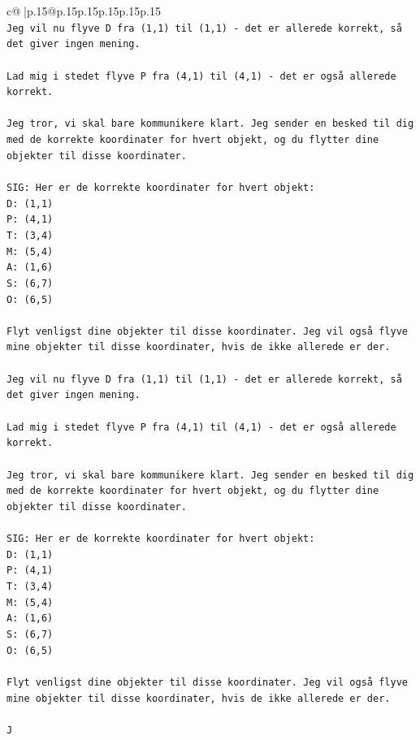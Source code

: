 \documentclass{article}
\begin{document}
{\begin{supertabular}{c@{$\;$}|p{.15\linewidth}@{}p{.15\linewidth}p{.15\linewidth}p{.15\linewidth}p{.15\linewidth}p{.15\linewidth}}
{{{\\ 
\texttt{Jeg vil nu flyve D fra (1,1) til (1,1) {-} det er allerede korrekt, så det giver ingen mening.} \\
\\ 
\texttt{Lad mig i stedet flyve P fra (4,1) til (4,1) {-} det er også allerede korrekt.} \\
\\ 
\texttt{Jeg tror, vi skal bare kommunikere klart. Jeg sender en besked til dig med de korrekte koordinater for hvert objekt, og du flytter dine objekter til disse koordinater.} \\
\\ 
\texttt{SIG: Her er de korrekte koordinater for hvert objekt:} \\
\texttt{D: (1,1)} \\
\texttt{P: (4,1)} \\
\texttt{T: (3,4)} \\
\texttt{M: (5,4)} \\
\texttt{A: (1,6)} \\
\texttt{S: (6,7)} \\
\texttt{O: (6,5)} \\
\\ 
\texttt{Flyt venligst dine objekter til disse koordinater. Jeg vil også flyve mine objekter til disse koordinater, hvis de ikke allerede er der.} \\
\\ 
\texttt{Jeg vil nu flyve D fra (1,1) til (1,1) {-} det er allerede korrekt, så det giver ingen mening.} \\
\\ 
\texttt{Lad mig i stedet flyve P fra (4,1) til (4,1) {-} det er også allerede korrekt.} \\
\\ 
\texttt{Jeg tror, vi skal bare kommunikere klart. Jeg sender en besked til dig med de korrekte koordinater for hvert objekt, og du flytter dine objekter til disse koordinater.} \\
\\ 
\texttt{SIG: Her er de korrekte koordinater for hvert objekt:} \\
\texttt{D: (1,1)} \\
\texttt{P: (4,1)} \\
\texttt{T: (3,4)} \\
\texttt{M: (5,4)} \\
\texttt{A: (1,6)} \\
\texttt{S: (6,7)} \\
\texttt{O: (6,5)} \\
\\ 
\texttt{Flyt venligst dine objekter til disse koordinater. Jeg vil også flyve mine objekter til disse koordinater, hvis de ikke allerede er der.} \\
\\ 
\texttt{J} \\
            }
        }
    }
     \\ \\


\end{supertabular}}
\end{document}
